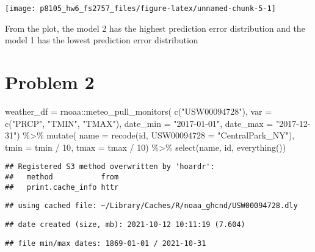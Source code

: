 \documentclass[
]{article}
\newenvironment{Shaded}{\begin{snugshade}}{\end{snugshade}}
\newcommand{\AttributeTok}[1]{\textcolor[rgb]{0.77,0.63,0.00}{#1}}
\newcommand{\DecValTok}[1]{\textcolor[rgb]{0.00,0.00,0.81}{#1}}
\newcommand{\FunctionTok}[1]{\textcolor[rgb]{0.00,0.00,0.00}{#1}}
\newcommand{\NormalTok}[1]{#1}
\newcommand{\OtherTok}[1]{\textcolor[rgb]{0.56,0.35,0.01}{#1}}
\newcommand{\SpecialCharTok}[1]{\textcolor[rgb]{0.00,0.00,0.00}{#1}}
\newcommand{\StringTok}[1]{\textcolor[rgb]{0.31,0.60,0.02}{#1}}
\begin{document}
\texttt{[image: p8105\_hw6\_fs2757\_files/figure-latex/unnamed-chunk-5-1]}

From the plot, the model 2 has the highest prediction error distribution
and the model 1 has the lowest prediction error distribution

\hypertarget{problem-2}{%
\section{Problem 2}\label{problem-2}}

\begin{Shaded}
\begin{Highlighting}[]
\NormalTok{weather\_df }\OtherTok{=} 
\NormalTok{  rnoaa}\SpecialCharTok{::}\FunctionTok{meteo\_pull\_monitors}\NormalTok{(}
    \FunctionTok{c}\NormalTok{(}\StringTok{"USW00094728"}\NormalTok{),}
    \AttributeTok{var =} \FunctionTok{c}\NormalTok{(}\StringTok{"PRCP"}\NormalTok{, }\StringTok{"TMIN"}\NormalTok{, }\StringTok{"TMAX"}\NormalTok{), }
    \AttributeTok{date\_min =} \StringTok{"2017{-}01{-}01"}\NormalTok{,}
    \AttributeTok{date\_max =} \StringTok{"2017{-}12{-}31"}\NormalTok{) }\SpecialCharTok{\%\textgreater{}\%}
  \FunctionTok{mutate}\NormalTok{(}
    \AttributeTok{name =} \FunctionTok{recode}\NormalTok{(id, }\AttributeTok{USW00094728 =} \StringTok{"CentralPark\_NY"}\NormalTok{),}
    \AttributeTok{tmin =}\NormalTok{ tmin }\SpecialCharTok{/} \DecValTok{10}\NormalTok{,}
    \AttributeTok{tmax =}\NormalTok{ tmax }\SpecialCharTok{/} \DecValTok{10}\NormalTok{) }\SpecialCharTok{\%\textgreater{}\%}
  \FunctionTok{select}\NormalTok{(name, id, }\FunctionTok{everything}\NormalTok{())}
\end{Highlighting}
\end{Shaded}

\begin{verbatim}
## Registered S3 method overwritten by 'hoardr':
##   method           from
##   print.cache_info httr
\end{verbatim}

\begin{verbatim}
## using cached file: ~/Library/Caches/R/noaa_ghcnd/USW00094728.dly
\end{verbatim}

\begin{verbatim}
## date created (size, mb): 2021-10-12 10:11:19 (7.604)
\end{verbatim}

\begin{verbatim}
## file min/max dates: 1869-01-01 / 2021-10-31
\end{verbatim}
\end{document}
